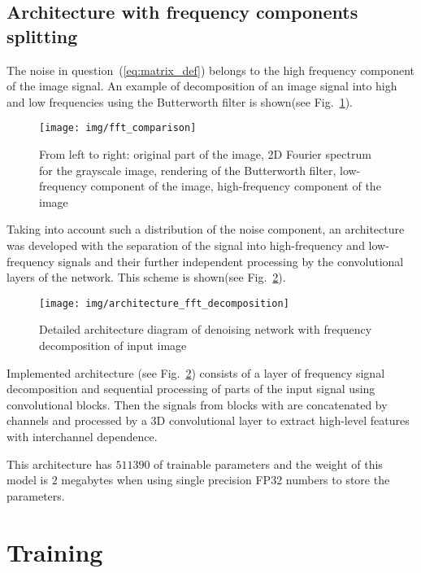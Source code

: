 \documentclass[runningheads]{llncs}
\begin{document}
\subsection{Architecture with frequency components splitting}

The noise in question~(\ref{eq:matrix_def}) belongs to the high frequency component of the image signal. An example of decomposition of an image signal into high and low frequencies using the Butterworth filter is shown(see Fig.~\ref {fig:fft_comparison}).

\begin{figure}
	\centering
	\texttt{[image: img/fft\_comparison]}
	\caption{From left to right: original part of the image, 2D Fourier spectrum for the grayscale image, rendering of the Butterworth filter, low-frequency component of the image, high-frequency component of the image}
	\label{fig:fft_comparison}
\end{figure}

Taking into account such a distribution of the noise component, an architecture was developed with the separation of the signal into high-frequency and low-frequency signals and their further independent processing by the convolutional layers of the network. This scheme is shown(see Fig.~\ref{fig:architecture_fft_decomposition}).

\begin{figure}
	\centering
	\texttt{[image: img/architecture\_fft\_decomposition]}
	\caption{Detailed architecture diagram of denoising network with frequency decomposition of input image}
	\label{fig:architecture_fft_decomposition}
\end{figure}

Implemented architecture (see Fig.~\ref{fig:architecture_fft_decomposition}) consists of a layer of frequency signal decomposition and sequential processing of parts of the input signal using convolutional blocks. Then the signals from blocks with are concatenated by channels and processed by a 3D convolutional layer to extract high-level features with interchannel dependence.

This architecture has $511390$ of trainable parameters and the weight of this model is $2$ megabytes when using single precision FP32 numbers to store the parameters.

\section{Training}
\end{document}
